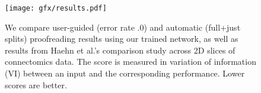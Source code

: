 \begin{figure}[t]
\centering
\texttt{[image: gfx/results.pdf]}
\caption{We compare user-guided (error rate .0) and automatic (full+just splits) proofreading results using our trained network,  as well as results from Haehn et al.'s comparison study \cite{haehn_dojo_2014} across 2D slices of connectomics data. The score is measured in variation of information (VI) between an input and the corresponding performance. Lower scores are better.}
\end{figure}
%
%
%
%
%
%
%
%
%
%

